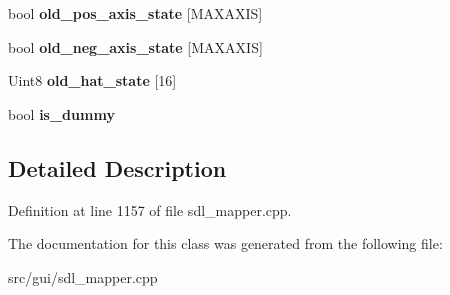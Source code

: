 \begin{DoxyCompactItemize}
\item 
\hypertarget{classCStickBindGroup_a283b8cbb49f54ad309ac461d31fcb8f3}{bool {\bfseries old\-\_\-pos\-\_\-axis\-\_\-state} \mbox{[}M\-A\-X\-A\-X\-I\-S\mbox{]}}\label{classCStickBindGroup_a283b8cbb49f54ad309ac461d31fcb8f3}

\item 
\hypertarget{classCStickBindGroup_abf4f7de4055e1e6a70016a6830a39128}{bool {\bfseries old\-\_\-neg\-\_\-axis\-\_\-state} \mbox{[}M\-A\-X\-A\-X\-I\-S\mbox{]}}\label{classCStickBindGroup_abf4f7de4055e1e6a70016a6830a39128}

\item 
\hypertarget{classCStickBindGroup_a19df3fcb72315b312752da5a66676dc3}{Uint8 {\bfseries old\-\_\-hat\-\_\-state} \mbox{[}16\mbox{]}}\label{classCStickBindGroup_a19df3fcb72315b312752da5a66676dc3}

\item 
\hypertarget{classCStickBindGroup_a23c7e557c5ce9b73c62321e8c1504abc}{bool {\bfseries is\-\_\-dummy}}\label{classCStickBindGroup_a23c7e557c5ce9b73c62321e8c1504abc}

\end{DoxyCompactItemize}


\subsection{Detailed Description}


Definition at line 1157 of file sdl\-\_\-mapper.\-cpp.



The documentation for this class was generated from the following file\-:\begin{DoxyCompactItemize}
\item 
src/gui/sdl\-\_\-mapper.\-cpp\end{DoxyCompactItemize}
